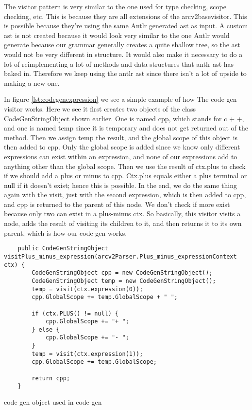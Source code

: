 The visitor pattern is very similar to the one used for type checking, scope checking, etc. This is because they are all extensions of the arcv2basevisitor. This is possible because they're using the same Antlr generated \gls{ast} as input. A custom \gls{ast} is not created because it would look very similar to the one Antlr would generate because our grammar generally creates a quite shallow tree, so the \gls{ast} would not be very different in structure. It would also make it necessary to do a lot of reimplementing a lot of methods and data structures that antlr \gls{ast} has baked in. Therefore we keep using the antlr \gls{ast} since there isn't a lot of upside to making a new one. 


In figure \ref{lst:codegenexpression} we see a simple example of how The code gen visitor works. Here we see it first creates two objects of the class CodeGenStringObject shown earlier. One is named cpp, which stands for c + +, and one is named temp since it is temporary and does not get returned out of the method. Then we assign temp the result, and the global scope of this object is then added to cpp. Only the global scope is added since we know only different expressions can exist within an expression, and none of our expressions add to anything other than the global scope. Then we use the result of ctx.plus to check if we should add a plus or minus to cpp. Ctx.plus equals either a plus terminal or null if it doesn't exist; hence this is possible. In the end, we do the same thing again with the visit, just with the second expression, which is then added to cpp, and cpp is returned to the parent of this node. We don't check if more exist because only two can exist in a plus-minus ctx. So basically, this visitor visits a node, adds the result of visiting its children to it, and then returns it to its own parent, which is how our code-gen works.


\begin{listing}[htb!]
    \begin{verbatim}
    public CodeGenStringObject visitPlus_minus_expression(arcv2Parser.Plus_minus_expressionContext ctx) {
        CodeGenStringObject cpp = new CodeGenStringObject();
        CodeGenStringObject temp = new CodeGenStringObject();
        temp = visit(ctx.expression(0));
        cpp.GlobalScope += temp.GlobalScope + " ";

        if (ctx.PLUS() != null) {
            cpp.GlobalScope += "+ ";
        } else {
            cpp.GlobalScope += "- ";
        }
        temp = visit(ctx.expression(1));
        cpp.GlobalScope += temp.GlobalScope;

        return cpp;
    }
    \end{verbatim}
    \caption{code gen object used in code gen}
    \label{lst:codegenexpression}
\end{listing}


